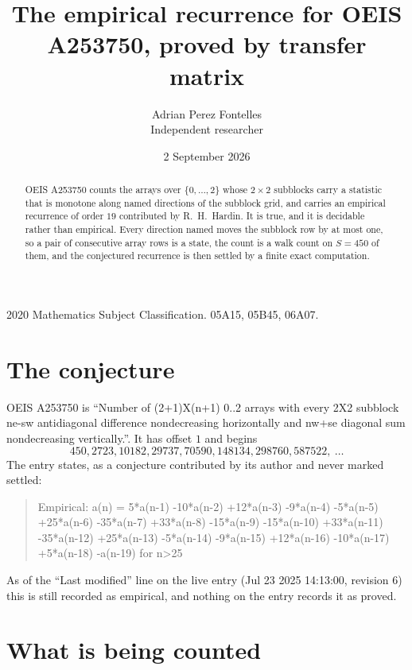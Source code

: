 \documentclass[11pt,a4paper]{article}
\title{The empirical recurrence for OEIS A253750, proved by transfer matrix}
\author{Adrian Perez Fontelles\\ \small Independent researcher}
\date{2 September 2026}
\theoremstyle{plain}
\theoremstyle{definition}
\begin{document}
\maketitle

\begin{abstract}
OEIS A253750 counts the arrays over $\{0,\dots,2\}$ whose $2\times2$ subblocks carry a
statistic that is monotone along named directions of the subblock grid, and carries an
empirical recurrence of order $19$ contributed by R.~H.~Hardin. It is true, and it is
decidable rather than empirical. Every direction named moves the subblock row by at most one,
so a pair of consecutive array rows is a state, the count is a walk count on $S=450$ of them,
and the conjectured recurrence is then settled by a finite exact computation.
\end{abstract}

\noindent\small 2020 Mathematics Subject Classification. 05A15, 05B45, 06A07.\normalsize

\section{The conjecture}

OEIS A253750 is ``Number of (2+1)X(n+1) 0..2 arrays with every 2X2 subblock ne-sw antidiagonal difference nondecreasing horizontally and nw+se diagonal sum nondecreasing vertically.''. It has offset $1$ and begins
\[
450, 2723, 10182, 29737, 70590, 148134, 298760, 587522,\ \dots
\]
The entry states, as a conjecture contributed by its author and never marked settled:
\begin{quote}
Empirical: a(n) = 5*a(n-1) -10*a(n-2) +12*a(n-3) -9*a(n-4) -5*a(n-5) +25*a(n-6) -35*a(n-7) +33*a(n-8) -15*a(n-9) -15*a(n-10) +33*a(n-11) -35*a(n-12) +25*a(n-13) -5*a(n-14) -9*a(n-15) +12*a(n-16) -10*a(n-17) +5*a(n-18) -a(n-19) for n>25
\end{quote}
As of the ``Last modified'' line on the live entry (Jul 23 2025 14:13:00, revision 6) this is still
recorded as empirical, and nothing on the entry records it as proved.

\section{What is being counted}
\end{document}
